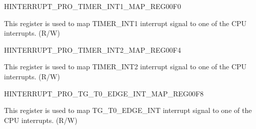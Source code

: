 \begin{register}{H}{INTERRUPT\_PRO\_TIMER\_INT1\_MAP\_REG}{\hexprefix{}00F0}\label{regdesc:INTERRUPTPROTIMERINT1MAPREG}
%
%
\regnewline%
\begin{regdesc}\begin{reglist}
\label{fielddesc:INTERRUPTPROTIMERINT1MAP}\item [INTERRUPT\_PRO\_TIMER\_INT1\_MAP] This register is used to map TIMER\_INT1 interrupt signal to one of the CPU interrupts. (R/W)
\end{reglist}\end{regdesc}
\end{register}


\begin{register}{H}{INTERRUPT\_PRO\_TIMER\_INT2\_MAP\_REG}{\hexprefix{}00F4}\label{regdesc:INTERRUPTPROTIMERINT2MAPREG}
%
%
\regnewline%
\begin{regdesc}\begin{reglist}
\label{fielddesc:INTERRUPTPROTIMERINT2MAP}\item [INTERRUPT\_PRO\_TIMER\_INT2\_MAP] This register is used to map TIMER\_INT2 interrupt signal to one of the CPU interrupts. (R/W)
\end{reglist}\end{regdesc}
\end{register}


\begin{register}{H}{INTERRUPT\_PRO\_TG\_T0\_EDGE\_INT\_MAP\_REG}{\hexprefix{}00F8}\label{regdesc:INTERRUPTPROTGT0EDGEINTMAPREG}
%
%
\regnewline%
\begin{regdesc}\begin{reglist}
\label{fielddesc:INTERRUPTPROTGT0EDGEINTMAP}\item [INTERRUPT\_PRO\_TG\_T0\_EDGE\_INT\_MAP] This register is used to map TG\_T0\_EDGE\_INT interrupt signal to one of the CPU interrupts. (R/W)
\end{reglist}\end{regdesc}
\end{register}


